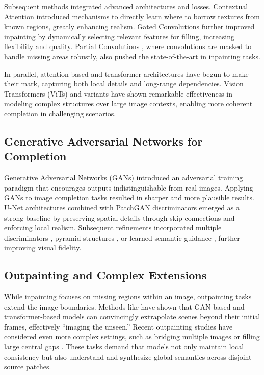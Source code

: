 \documentclass[sigconf]{acmart}
\begin{document}
Subsequent methods integrated advanced architectures and losses. Contextual Attention \cite{Yu2018} introduced mechanisms to directly learn where to borrow textures from known regions, greatly enhancing realism. Gated Convolutions \cite{Yu2019} further improved inpainting by dynamically selecting relevant features for filling, increasing flexibility and quality. Partial Convolutions \cite{Liu2018}, where convolutions are masked to handle missing areas robustly, also pushed the state-of-the-art in inpainting tasks.

In parallel, attention-based and transformer architectures \cite{Jiahui2018,Dosovitskiy2020,Liu2021} have begun to make their mark, capturing both local details and long-range dependencies. Vision Transformers (ViTs) and variants \cite{Zeng2022} have shown remarkable effectiveness in modeling complex structures over large image contexts, enabling more coherent completion in challenging scenarios.

\subsection*{Generative Adversarial Networks for Completion}
Generative Adversarial Networks (GANs) \cite{Goodfellow2014} introduced an adversarial training paradigm that encourages outputs indistinguishable from real images. Applying GANs to image completion tasks \cite{Pathak2016,Li2017,Song2018,Isola2017} resulted in sharper and more plausible results. U-Net architectures \cite{Ronneberger2015} combined with PatchGAN discriminators \cite{Isola2017} emerged as a strong baseline by preserving spatial details through skip connections and enforcing local realism. Subsequent refinements incorporated multiple discriminators \cite{Wang2018}, pyramid structures \cite{Nazeri2019}, or learned semantic guidance \cite{Song2019}, further improving visual fidelity.

\subsection*{Outpainting and Complex Extensions}
While inpainting focuses on missing regions within an image, outpainting tasks extend the image boundaries. Methods like \cite{Yang2019,Gao2022} have shown that GAN-based and transformer-based models can convincingly extrapolate scenes beyond their initial frames, effectively “imaging the unseen.” Recent outpainting studies have considered even more complex settings, such as bridging multiple images or filling large central gaps \cite{Lu2021,Tang2024}. These tasks demand that models not only maintain local consistency but also understand and synthesize global semantics across disjoint source patches.
\end{document}
